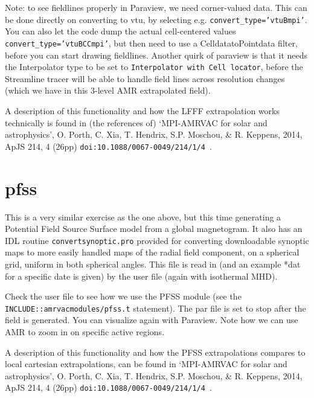 \documentclass[10pt]{article}
\begin{document}
Note: to see fieldlines properly in Paraview, we need corner-valued data. This can be done directly on converting to vtu, by selecting e.g. {\tt convert\_type='vtuBmpi'}. You can also let the code dump the actual cell-centered values {\tt convert\_type='vtuBCCmpi'}, but then need to use a CelldatatoPointdata filter, before you can start drawing fieldlines. Another quirk of paraview is that it needs the Interpolator type to be set to {\tt Interpolator with Cell locator}, before the Streamline tracer will be able to handle field lines across resolution changes (which we have in this 3-level AMR extrapolated field).

A description of this functionality and how the LFFF extrapolation works technically is found in (the references of)
`MPI-AMRVAC for solar and astrophysics', O. Porth, C. Xia, T. Hendrix, S.P. Moschou, \& R. Keppens, 2014, ApJS 214, 4 (26pp) {\tt doi:10.1088/0067-0049/214/1/4 }.

\section*{pfss}

This is a very similar exercise as the one above, but this time generating a Potential Field Source Surface model from a global magnetogram. It also has an IDL routine {\tt convertsynoptic.pro} provided for converting downloadable synoptic maps to more easily handled maps of the radial field component, on a spherical grid, uniform in both spherical angles. This file is read in (and an example *dat for a specific date is given) by the user file (again with isothermal MHD).

Check the user file to see how we use the PFSS module (see the {\tt INCLUDE::amrvacmodules/pfss.t} statement). The par file is set to stop after the field is generated. You can visualize again with Paraview. Note how we can use AMR to zoom in on specific active regions.

A description of this functionality and how the PFSS extrapolations compares to local cartesian extrapolations, can be found in
`MPI-AMRVAC for solar and astrophysics', O. Porth, C. Xia, T. Hendrix, S.P. Moschou, \& R. Keppens, 2014, ApJS 214, 4 (26pp) {\tt doi:10.1088/0067-0049/214/1/4 }.
\end{document}
